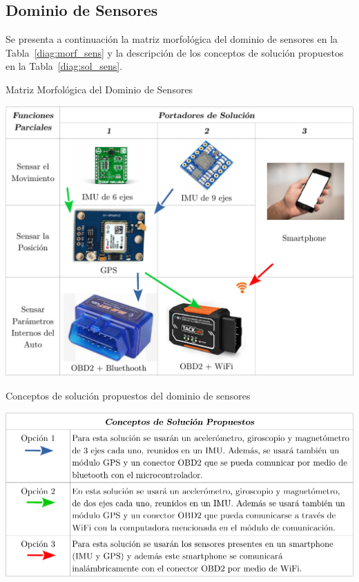 \subsection{Dominio de Sensores}
Se presenta a continuación la matriz morfológica del dominio de sensores en la Tabla~\ref{diag:morf_sens} y la descripción de los conceptos de solución propuestos en la Tabla~\ref{diag:sol_sens}.
\begin{table}[htbp!]
  \caption{Matriz Morfológica del Dominio de Sensores}
  \label{diag:morf_sens}
  \centering
  \includegraphics[width=0.9\linewidth]{morf_sens.pdf}
\end{table}

\newpage

\begin{table}[htbp!]
  \caption{Conceptos de solución propuestos del dominio de sensores}
  \label{diag:sol_sens}
  \includegraphics[width=\linewidth]{sol_sens.pdf}
\end{table}








